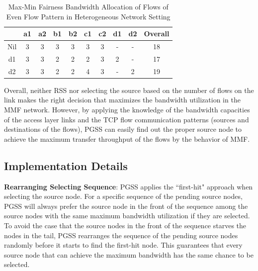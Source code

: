 \documentclass[10pt,journal,compsoc]{IEEEtran}
\begin{document}
\begin{table}[!t]
\renewcommand{\arraystretch}{1}
\caption{Max-Min Fairness Bandwidth Allocation of Flows of Even Flow Pattern in Heterogeneous Network Setting}
\label{table:heteEven}
\centering
\begin{tabularx}{.45\textwidth}{c||c|c|c|c|c|c|c|c|c}
\hline
\textbf{} & \textbf{a1} & \textbf{a2} & \textbf{b1} & \textbf{b2} & \textbf{c1} &\textbf{c2}& \textbf{d1}& \textbf{d2} &\textbf{Overall}\\
\hline
Nil &3&3&3&3&3&3&-&-&18\\
\hline
d1 &3&3&2&2&2&3&2&-&17\\
\hline
d2 &3&3&2&2&4&3&-&2&19\\
\hline
\end{tabularx}
\end{table}

Overall, neither RSS nor selecting the source based on the number of flows on
the link makes the right decision that
maximizes the bandwidth utilization in the MMF network.
However, by applying the knowledge
of the bandwidth capacities of the
access layer links and the TCP flow communication patterns (sources
and destinations of the flows),
PGSS can easily find out the proper source node to achieve the maximum
transfer throughput of the flows by
the behavior of MMF.


\subsection{Implementation Details}

\textbf{Rearranging Selecting Sequence}: PGSS applies the ``first-hit" approach when selecting the source node. 
For a specific sequence of the pending source nodes, PGSS will always
prefer the source node in the front of the sequence
among the source nodes with the same maximum bandwidth utilization
if they are selected.
To avoid the case that the source nodes in the front
of the sequence starves the nodes in the tail,
PGSS rearranges the sequence of the pending source nodes randomly
before it starts to find the first-hit node.
This guarantees that every source node that can achieve the maximum
bandwidth has the same chance to be selected.
\end{document}

